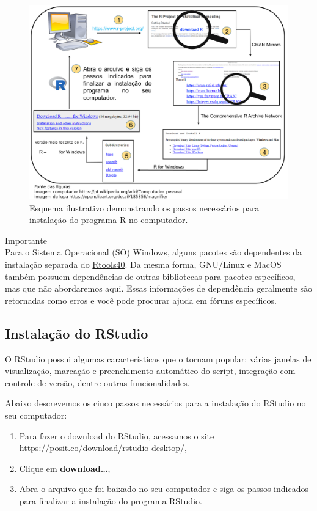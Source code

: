 \documentclass[
]{article}
\providecommand{\tightlist}{%
  \setlength{\itemsep}{0pt}\setlength{\parskip}{0pt}}
\begin{document}
\begin{figure}

{\centering \includegraphics[width=0.75\linewidth,height=0.75\textheight]{figures/cap03_fig01} 

}

\caption{Esquema ilustrativo demonstrando os passos necessários para instalação do programa R no computador. }\label{fig:fig-r-instalacao}
\end{figure}

Importante \\
Para o Sistema Operacional (SO) Windows, alguns pacotes são dependentes da instalação separada do \href{https://cran.rstudio.com/bin/windows/Rtools/}{Rtools40}. Da mesma forma, GNU/Linux e MacOS também possuem dependências de outras bibliotecas para pacotes específicos, mas que não abordaremos aqui. Essas informações de dependência geralmente são retornadas como erros e você pode procurar ajuda em fóruns específicos.

\hypertarget{instalauxe7uxe3o-do-rstudio}{%
\subsection{Instalação do RStudio}\label{instalauxe7uxe3o-do-rstudio}}

O RStudio possui algumas características que o tornam popular: várias janelas de visualização, marcação e preenchimento automático do script, integração com controle de versão, dentre outras funcionalidades.

Abaixo descrevemos os cinco passos necessários para a instalação do RStudio no seu computador:

\begin{enumerate}
\def\labelenumi{\arabic{enumi}.}
\tightlist
\item
  Para fazer o download do RStudio, acessamos o site \url{https://posit.co/download/rstudio-desktop/},
\item
  Clique em \textbf{download\ldots{}},
\item
  Abra o arquivo que foi baixado no seu computador e siga os passos indicados para finalizar a instalação do programa RStudio.
\end{enumerate}
\end{document}
